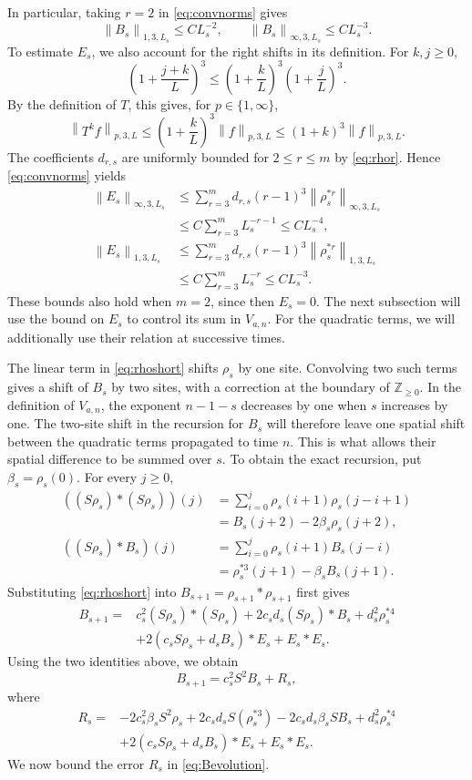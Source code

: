 \documentclass[11pt,letterpaper,reqno]{amsart}
\numberwithin{equation}{section}
\theoremstyle{plain}
\theoremstyle{remark}
\newcommand{\Zp}{\mathbb Z_{\ge0}}
\newcommand{\norm}[1]{\left\lVert#1\right\rVert}
\begin{document}
In particular, taking $r=2$ in \eqref{eq:convnorms} gives
\[
 \norm{B_s}_{1,3,L_s}\le CL_s^{-2},\qquad
 \norm{B_s}_{\infty,3,L_s}\le CL_s^{-3}.
\]
To estimate $E_s$, we also account for the right shifts in its definition.
For $k,j\ge0$,
\[
 \left(1+\frac{j+k}{L}\right)^3
 \le\left(1+\frac kL\right)^3\left(1+\frac jL\right)^3.
\]
By the definition of $T$, this gives, for $p\in\{1,\infty\}$,
\[
 \norm{T^kf}_{p,3,L}
 \le\left(1+\frac kL\right)^3\norm f_{p,3,L}
 \le(1+k)^3\norm f_{p,3,L}.
\]
The coefficients $d_{r,s}$ are uniformly bounded for $2\le r\le m$
by \eqref{eq:rhor}. Hence \eqref{eq:convnorms} yields
\[
 \begin{aligned}
 \norm{E_s}_{\infty,3,L_s}
 &\le\sum_{r=3}^m d_{r,s}(r-1)^3
                   \norm{\rho_s^{*r}}_{\infty,3,L_s}\\
 &\le C\sum_{r=3}^m L_s^{-r-1}
 \le CL_s^{-4},\\
 \norm{E_s}_{1,3,L_s}
 &\le\sum_{r=3}^m d_{r,s}(r-1)^3
                   \norm{\rho_s^{*r}}_{1,3,L_s}\\
 &\le C\sum_{r=3}^m L_s^{-r}
 \le CL_s^{-3}.
 \end{aligned}
\]
These bounds also hold when $m=2$, since then $E_s=0$.
The next subsection will use the bound on $E_s$ to control its sum in
$V_{a,n}$. For the quadratic terms, we will additionally use their
relation at successive times.

The linear term in \eqref{eq:rhoshort} shifts $\rho_s$ by one site.
Convolving two such terms gives a shift of $B_s$ by two sites, with a
correction at the boundary of $\Zp$. In the definition of $V_{a,n}$,
the exponent $n-1-s$ decreases by one when $s$ increases by one.
The two-site shift in the recursion for $B_s$ will therefore leave
one spatial shift between the quadratic terms propagated to time $n$.
This is what allows their spatial difference to be summed over $s$.
To obtain the exact recursion, put $\beta_s=\rho_s(0)$.
For every $j\ge0$,
\[
 \begin{aligned}
 ((S\rho_s)*(S\rho_s))(j)
 &=\sum_{i=0}^j\rho_s(i+1)\rho_s(j-i+1)\\
 &=B_s(j+2)-2\beta_s\rho_s(j+2),\\
 ((S\rho_s)*B_s)(j)
 &=\sum_{i=0}^j\rho_s(i+1)B_s(j-i)\\
 &=\rho_s^{*3}(j+1)-\beta_sB_s(j+1).
 \end{aligned}
\]
Substituting \eqref{eq:rhoshort} into
$B_{s+1}=\rho_{s+1}*\rho_{s+1}$ first gives
\[
 \begin{aligned}
 B_{s+1}={}&c_s^2(S\rho_s)*(S\rho_s)
       +2c_sd_s(S\rho_s)*B_s+d_s^2\rho_s^{*4}\\
       &+2(c_sS\rho_s+d_sB_s)*E_s+E_s*E_s.
 \end{aligned}
\]
Using the two identities above, we obtain
\begin{equation}\label{eq:Bevolution}
 B_{s+1}=c_s^2S^2B_s+R_s,
\end{equation}
where
\begin{align*}
 R_s={}&-2c_s^2\beta_sS^2\rho_s
       +2c_sd_sS(\rho_s^{*3})
       -2c_sd_s\beta_sSB_s+d_s^2\rho_s^{*4}\\
       &+2(c_sS\rho_s+d_sB_s)*E_s+E_s*E_s.
\end{align*}
We now bound the error $R_s$ in \eqref{eq:Bevolution}.
\end{document}
